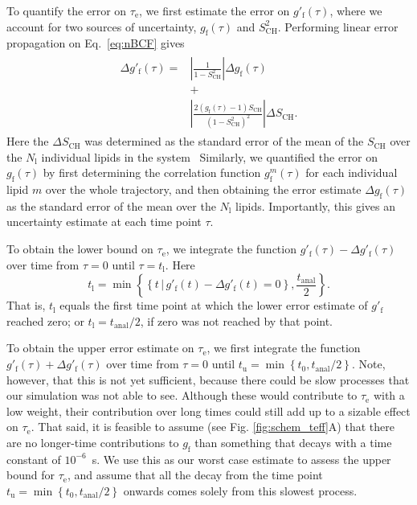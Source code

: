 \documentclass[journal=jcisd8,manuscript=article,layout=twocolumn]{achemso}
\begin{document}
To quantify the error on $\tau_\mathrm e$, we first estimate the error on $g'_\mathrm f(\tau)$,%
where we account for two sources of uncertainty, $g_{\mathrm{f}}(\tau)$ and $S^2_\mathrm{CH}$.
%
Performing linear error propagation on Eq.~\eqref{eq:nBCF} gives
\begin{align}
\begin{split}
\label{eq:error}
\Delta g'_{\mathrm{f}}(\tau)
=
&\left|
	\frac{1}{1-S^2_\mathrm{CH}}
\right|
\Delta g_{\mathrm{f}}(\tau)\\
&+\\
&\left|
	\frac{2\left(g_\mathrm{f}(\tau)-1\right)S_\mathrm{CH}}{\left(1-S^2_\mathrm{CH}\right)^2}
\right|
\Delta S_\mathrm{CH}.
\end{split}
\end{align}
Here the $\Delta S_\mathrm{CH}$ was determined 
as the standard error of the mean of the $S_\mathrm{CH}$ over the $N_\mathrm l$ individual lipids in the system~\cite{botan15}
%
Similarly, we quantified the error on $g_{\mathrm{f}}(\tau)$
by first determining the correlation function $g^m_{\mathrm{f}}(\tau)$ for each individual lipid $m$
over the whole trajectory, and then obtaining the error estimate
$\Delta g_{\mathrm{f}}(\tau)$
as the standard error of the mean over the $N_\mathrm l$ lipids.
%
Importantly, this gives an uncertainty estimate at each time point $\tau$.

To obtain the lower bound on $\tau_\mathrm e$, we integrate the function
$g'_{\mathrm{f}}(\tau) - \Delta g'_{\mathrm{f}}(\tau)$ over time from $\tau=0$ until $\tau=t_\mathrm l$.
Here
\begin{equation}
t_\mathrm l= \min
\left\{
	\left\{
		t\,|\,g'_{\mathrm{f}}(t) - \Delta g'_{\mathrm{f}}(t) = 0
	\right\},
	\frac{t_\mathrm{anal}}{2}
\right\}.
\end{equation}
That is,
$t_\mathrm l$ equals
the first time point at which the lower error estimate of $g'_\mathrm f$ reached zero;
or $t_\mathrm l=t_\mathrm{anal}/2$, if zero was not reached by that point.

To obtain the upper error estimate on $\tau_\mathrm e$, we first integrate the function
$g'_{\mathrm{f}}(\tau) + \Delta g'_{\mathrm{f}}(\tau)$ over time from $\tau=0$ until
$
t_\mathrm u= \min
\left\{
	t_0,
	{t_\mathrm{anal}}/{2}
\right\}.
$
Note, however,
that this is not yet sufficient, because there could be slow processes that our simulation was not
able to see. Although these would contribute to $\tau_\mathrm e$ with a low weight,
their contribution over long times could still add up to a sizable effect on $\tau_\mathrm e$.
%
That said, it is feasible to assume (see Fig. \ref{fig:schem_teff}A) that there are no longer-time contributions
to $g_\mathrm f$ than something that decays with a time constant of $10^{-6}$~s.
%
We use this as our worst case estimate to assess the upper bound for $\tau_\mathrm e$, and
%
assume that all the decay from the time point
$
t_\mathrm u= \min
\left\{
	t_0,
	{t_\mathrm{anal}}/{2}
\right\}
$
onwards comes solely from this slowest process.
%
\end{document}
